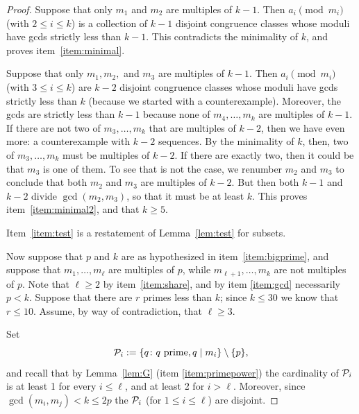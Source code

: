 \documentclass[12pt]{article}
\begin{document}
\begin{proof}
Suppose that only $m_1$ and $m_2$ are multiples of $k-1$. Then $a_i \pmod{m_i}$ (with $2\le i \le k$) is a
collection of $k-1$ disjoint congruence classes whose moduli have gcds strictly less than $k-1$. This
contradicts the minimality of $k$, and proves item~\ref{item:minimal}.

Suppose that only $m_1, m_2,$ and $m_3$ are multiples of $k-1$. Then $a_i\pmod{m_i}$ (with $3\le i \le k$) are
$k-2$ disjoint congruence classes whose moduli have gcds strictly less than $k$ (because we started with a
counterexample). Moreover, the gcds are strictly less than $k-1$ because none of $m_4,\dots,m_k$ are multiples
of $k-1$. If there are not two of $m_3, \dots, m_k$ that are multiples of $k-2$, then we have even more: a
counterexample with $k-2$ sequences. By the minimality of $k$, then, two of $m_3,\dots,m_k$ must be multiples of
$k-2$. If there are exactly two, then it could be that $m_3$ is one of them. To see that is not the case, we
renumber $m_2$ and $m_3$ to conclude that both $m_2$ and $m_3$ are multiples of $k-2$. But then both $k-1$ and
$k-2$ divide $\gcd(m_2,m_3)$, so that it must be at least $k$. This proves item~\ref{item:minimal2}, and that
$k\ge 5$.

Item~\ref{item:test} is a restatement of Lemma~\ref{lem:test} for subsets.

Now suppose that $p$ and $k$ are as hypothesized in item~\ref{item:bigprime}, and suppose that
$m_1,\dots,m_\ell$ are multiples of $p$, while $m_{\ell+1},\dots,m_k$ are not multiples of $p$. Note that
$\ell\ge2$ by item~\ref{item:share}, and by item \ref{item:gcd} necessarily $p<k$. Suppose that there are $r$
primes less than $k$; since $k\le 30$ we know that $r\le 10$. Assume, by way of contradiction, that $\ell\ge 3$.

Set
    \[
    {\cal P}_i := \{q \colon q\text{ prime}, q \mid m_i\}\setminus\{p\},\]
and recall that by Lemma~\ref{lem:G} (item \ref{item:primepower}) the cardinality of ${\cal P}_i$ is at least 1
for every $i\le \ell$, and at least 2 for $i>\ell$. Moreover, since $\gcd(m_i,m_j)<k\le 2p$ the ${\cal P}_i$
(for $1\le i \le \ell$) are disjoint.


\end{proof}
\end{document}
